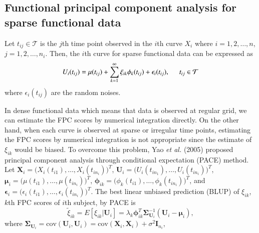 \documentclass[eng]{csam}
\def \bY { \mathbf{ Y } }
\def \bX { \mathbf{ X } }
\def \bU { \mathbf{ U } }
\def \bmu { \boldsymbol{ \mu } }
\def \bSigma { \boldsymbol{ \Sigma } }
\def \bphi { \boldsymbol{ \phi } }
\def \bepsilon { \boldsymbol{ \epsilon } }
\begin{document}
\subsection{Functional principal component analysis for sparse functional data}
Let $t_{ij} \in \mathcal{T}$ is the $j$th time point observed in the $i$th curve $X_i$ where $i = 1, 2, \dots, n$, $j = 1, 2, \dots, n_i$.
Then, the $i$th curve for sparse functional data can be expressed as
\begin{equation}
U_i(t_{ij}) = \mu(t_{ij}) + \sum_{k=1}^\infty \xi_{ik} \phi_k(t_{ij}) + \epsilon_i(t_{ij}), \hspace{0.5cm} t_{ij} \in \mathcal{T}
\end{equation}
where $\epsilon_i(t_{ij})$ are the random noises.

In dense functional data which means that data is observed at regular grid, we can estimate the FPC scores by numerical integration directly. 
On the other hand, when each curve is observed at sparse or irregular time points, estimating the FPC scores by numerical integration is not appropriate since the estimate of $\xi_{ik}$ would be biased. To overcome this problem, Yao {\em et al.} (2005) proposed principal component analysis through conditional expectation (PACE) method.
Let $\bX_i = \big( X_i(t_{i1}), \dots, X_i(t_{in_i}) \big)^T$, $\bU_i = \big( U_i(t_{in_1}), \dots, U_i(t_{in_i}) \big)^T$, $\bmu_i = \big( \mu(t_{i1}), \dots, \mu(t_{in_i}) \big)^T$, $\bphi_{ik} = \big( \phi_k(t_{i1}), \dots, \phi_k(t_{in_i}) \big)^T$, and $\bepsilon_i = \big( \epsilon_i(t_{i1}), \dots, \epsilon_i(t_{in_i}) \big)^T$.
The best linear unbiased prediction (BLUP) of $\xi_{ik}$, $k$th FPC scores of $i$th subject, by PACE is
\begin{equation}
\tilde \xi_{ik} = E[\xi_{ik} \vert \bU_i] = \lambda_k \bphi_{ik}^T\bSigma_{\bU_i}^{-1}(\bU_i - \bmu_i),
\end{equation}
where $\bSigma_{\bU_i} = \text{cov}(\bU_i, \bU_i) = \text{cov}(\bX_i, \bX_i) + \sigma^2\mathbf{I}_{n_i}$,
\end{document}
